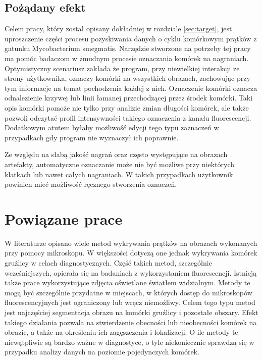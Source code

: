\documentclass[declaration,shortabstract,mgr]{iithesis}
\begin{document}
\subsection{Pożądany efekt}

Celem pracy, który został opisany dokładniej w rozdziale \ref{sec:target}, jest uproszczenie części procesu pozyskiwania danych o cyklu komórkowym prątków z gatunku Mycobacterium smegmatis.
Narzędzie stworzone na potrzeby tej pracy ma pomóc badaczom w żmudnym procesie oznaczania komórek na nagraniach.
Optymistyczny scenariusz zakłada że program, przy niewielkiej interakcji ze strony użytkownika, oznaczy komórki na wszystkich obrazach, zachowując przy tym informacje na temat pochodzenia każdej z nich.
Oznaczenie komórki oznacza odnalezienie krzywej lub linii łamanej przechodzącej przez środek komórki.
Taki opis komórki pomoże nie tylko przy analizie zmian długości komórek, ale także pozwoli odczytać profil intensywności takiego oznaczenia z kanału fluorescencji.
Dodatkowym atutem byłaby możliwość edycji tego typu zaznaczeń w przypadkach gdy program nie wyznaczył ich poprawnie.

Ze względu na słabą jakość nagrań oraz często występujące na obrazach artefakty, automatyczne oznaczanie może nie być możliwe przy niektórych klatkach lub nawet całych nagraniach.
W takich przypadkach użytkownik powinien mieć możliwość ręcznego stworzenia oznaczeń.

\section{Powiązane prace}

W literaturze opisano wiele metod wykrywania prątków na obrazach wykonanych przy pomocy mikroskopu.
W większości dotyczą one jednak wykrywania komórek gruźlicy w celach diagnostycznych.
Część takich metod, szczególnie wcześniejszych, opierała się na badaniach z wykorzystaniem fluorescencji\cite{paper:detection-of-tb-with-ip}.
Istnieją także prace wykorzystujące zdjęcia oświetlane światłem widzialnym.
Metody te mogą być szczególnie przydatne w miejscach, w których dostęp do mikroskopów fluorescencyjnych jest ograniczony lub wręcz niemożliwy\cite{paper:ip-techniques-for-identifying-tb}.
Celem tego typu metod jest najczęściej segmentacja obrazu na komórki gruźlicy i pozostałe obszary.
Efekt takiego działania pozwala na stwierdzenie obecności lub nieobecności komórek na obrazie, a także na określeniu ich zagęszczenia i lokalizacji. O ile metody te niewątpliwie są bardzo ważne w diagnostyce, o tyle niekoniecznie sprawdzą się w przypadku analizy danych na poziomie pojedynczych komórek.
\end{document}
